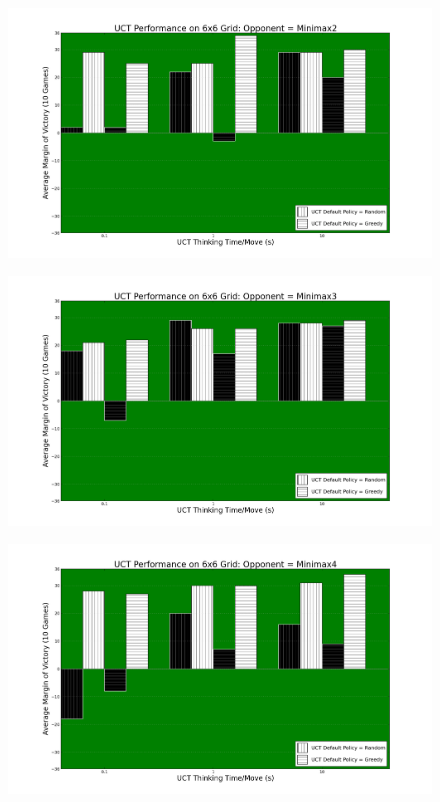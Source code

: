 \documentclass[12pt,letterpaper]{article}
\begin{document}
\begin{figure}[!hp]
\begin{center}
\includegraphics[scale=.4]{66_Minimax2}
\end{center}
\end{figure}

\begin{figure}[!hp]
\begin{center}
\includegraphics[scale=.4]{66_Minimax3}
\end{center}
\end{figure}

\begin{figure}[!h]
\begin{center}
\includegraphics[scale=.4]{66_Minimax4}
\end{center}
\end{figure}
\end{document}
